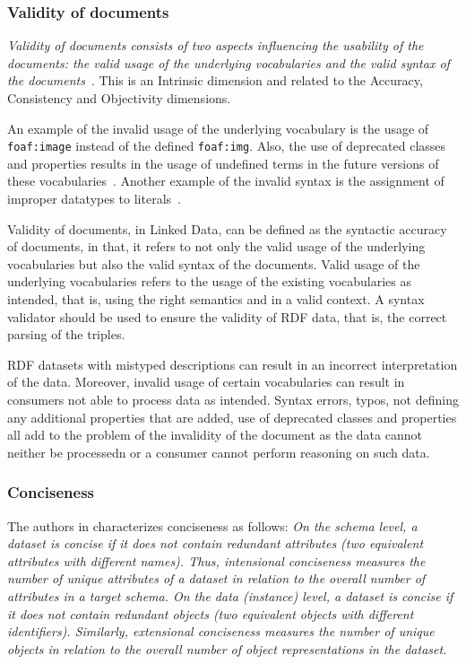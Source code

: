 \subsubsection{Validity of documents}
\emph{Validity of documents consists of two aspects influencing the usability of the documents: the valid usage of the underlying vocabularies and the valid syntax of the documents}~\cite{Flemming}. 
This is an Intrinsic dimension and related to the Accuracy, Consistency and Objectivity dimensions.

An example of the invalid usage of the underlying vocabulary is the usage of \texttt{foaf:image} instead of the defined \texttt{foaf:img}. 
Also, the use of deprecated classes and properties results in the usage of undefined terms in the future versions of these vocabularies~\cite{Hogan}. 
Another example of the invalid syntax is the assignment of improper datatypes to literals~\cite{Hogan}.

\begin{definition}
Validity of documents, in Linked Data, can be defined as the syntactic accuracy of documents, in that, it refers to not only the valid usage of the underlying vocabularies but also the valid syntax of the documents. 
Valid usage of the underlying vocabularies refers to the usage of the existing vocabularies as intended, that is, using the right semantics and in a valid context.
A syntax validator should be used to ensure the validity of RDF data, that is, the correct parsing of the triples. 
\end{definition}

RDF datasets with mistyped descriptions can result in an incorrect interpretation of the data.
Moreover, invalid usage of certain vocabularies can result in consumers not able to process data as intended.
Syntax errors, typos, not defining any additional properties that are added, use of deprecated classes and properties all add to the problem of the invalidity of the document as the data cannot neither be processedn or a consumer cannot perform reasoning on such data. 

\subsubsection{Conciseness}
 The authors in \cite{Mendes} characterizes conciseness as follows: \emph{On the schema level, a dataset is concise if it does not contain redundant attributes (two equivalent attributes with different names). 
Thus, intensional conciseness measures the number of unique attributes of a dataset in relation to the overall number of attributes in a target schema.
On the data (instance) level, a dataset is concise if it does not contain redundant objects (two equivalent objects with different identifiers). 
Similarly, extensional conciseness measures the number of unique objects in relation to the overall number of object representations in the dataset.}

